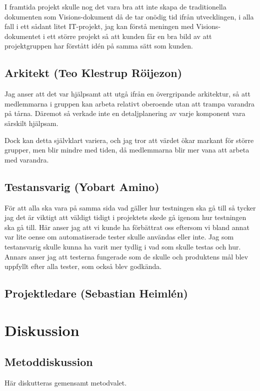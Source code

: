 \documentclass[conference,a4paper]{IEEEtran}
\begin{document}
I framtida projekt skulle nog det vara bra att inte skapa de traditionella dokumenten som Visions-dokument då de tar onödig tid ifrån utvecklingen, i alla fall i ett sådant litet IT-projekt, jag kan förstå meningen med Visions-dokumentet i ett större projekt så att kunden får en bra bild av att projektgruppen har förstått idén på samma sätt som kunden.


\subsection{Arkitekt (Teo Klestrup Röijezon)}
Jag anser att det var hjälpsamt att utgå ifrån en övergripande arkitektur, så att medlemmarna i gruppen kan arbeta relativt oberoende utan att trampa varandra på tårna. Däremot så verkade inte en detaljplanering av varje komponent vara särskilt hjälpsam.

Dock kan detta självklart variera, och jag tror att värdet ökar markant för större grupper, men blir mindre med tiden, då medlemmarna blir mer vana att arbeta med varandra.

\subsection{Testansvarig (Yobart Amino)}
För att alla ska vara på samma sida vad gäller hur testningen ska gå till så tycker jag det är viktigt att väldigt tidigt i projektets skede gå igenom hur testningen ska gå till. Här anser jag att vi kunde ha förbättrat oss eftersom vi bland annat var lite oense om automatiserade tester skulle användas eller inte. Jag som testansvarig skulle kunna ha varit mer tydlig i vad som skulle testas och hur. 
Annars anser jag att testerna fungerade som de skulle och produktens mål blev uppfyllt efter alla tester, som också blev godkända.

\subsection{Projektledare (Sebastian Heimlén)}

\section{Diskussion} \label{sec:disk}

\subsection{Metoddiskussion}
Här diskutteras gemensamt metodvalet.
\end{document}
